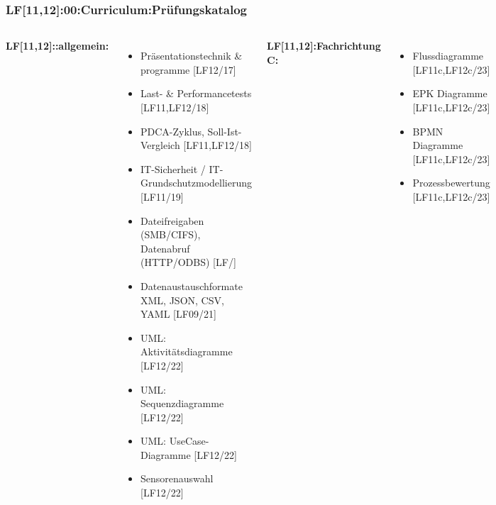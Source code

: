 

\begin{frame}
  \frametitle{LF[11,12]:00:Curriculum:Prüfungskatalog}
  \begin{tiny}
  \begin{columns}[T]
    \textbf{LF[11,12]::allgemein:}
    \begin{itemize}
      \item[\faSquareO] Präsentationstechnik \& programme [LF12/17]
      \item[\faSquareO] Last- \& Performancetests [LF11,LF12/18]
      \item[\faSquareO] PDCA-Zyklus, Soll-Ist-Vergleich [LF11,LF12/18]
      \item[\faSquareO] IT-Sicherheit / IT-Grundschutzmodellierung [LF11/19]
      \item[\faSquareO] Dateifreigaben (SMB/CIFS), Datenabruf (HTTP/ODBS)  [LF/]
      \item[\faSquareO] Datenaustauschformate XML, JSON, CSV, YAML [LF09/21]
      \item[\faSquareO] UML: Aktivitätsdiagramme [LF12/22]
      \item[\faSquareO] UML: Sequenzdiagramme [LF12/22]
      \item[\faSquareO] UML: UseCase-Diagramme [LF12/22]
      \item[\faSquareO] Sensorenauswahl [LF12/22]
    \end{itemize}
    \textbf{LF[11,12]:Fachrichtung C:}
    \begin{itemize}
      \item[\faSquareO] Flussdiagramme [LF11c,LF12c/23]
      \item[\faSquareO] EPK Diagramme [LF11c,LF12c/23]
      \item[\faSquareO] BPMN Diagramme [LF11c,LF12c/23]
      \item[\faSquareO] Prozessbewertung [LF11c,LF12c/23]

\end{itemize}
\end{columns}
\end{tiny}
\end{frame}
